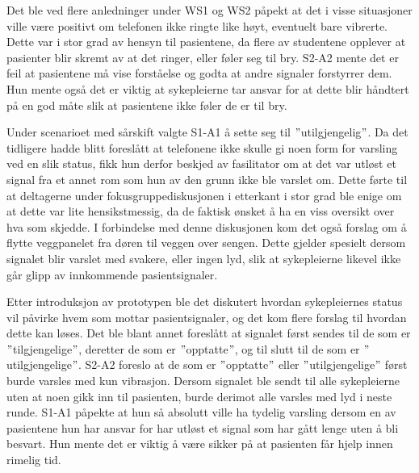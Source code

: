 \noindent
Det ble ved flere anledninger under WS1 og WS2 påpekt at det i visse situasjoner ville være positivt om telefonen ikke ringte like høyt, eventuelt bare vibrerte. Dette var i stor grad av hensyn til pasientene, da flere av studentene opplever at pasienter blir skremt av at det ringer, eller føler seg til bry. S2-A2 mente det er feil at pasientene må vise forståelse og godta at andre signaler forstyrrer dem. Hun mente også det er viktig at sykepleierne tar ansvar for at dette blir håndtert på en god måte slik at pasientene ikke føler de er til bry. 

\noindent
Under scenarioet med sårskift valgte S1-A1 å sette seg til $"$utilgjengelig$"$. Da det tidligere hadde blitt foreslått at telefonene ikke skulle gi noen form for varsling ved en slik status, fikk hun derfor beskjed av fasilitator om at det var utløst et signal fra et annet rom som hun av den grunn ikke ble varslet om. Dette førte til at deltagerne under fokusgruppediskusjonen i etterkant i stor grad ble enige om at dette var lite hensikstmessig, da de faktisk ønsket å ha en viss oversikt over hva som skjedde. I forbindelse med denne diskusjonen kom det også forslag om å flytte veggpanelet fra døren til veggen over sengen. Dette gjelder spesielt dersom signalet blir varslet med svakere, eller ingen lyd, slik at sykepleierne likevel ikke går glipp av innkommende pasientsignaler.

\noindent
Etter introduksjon av prototypen ble det diskutert hvordan sykepleiernes status vil påvirke hvem som mottar pasientsignaler, og det kom flere forslag til hvordan dette kan løses. Det ble blant annet foreslått at signalet først sendes til de som er $"$tilgjengelige$"$, deretter de som er $"$opptatte$"$, og til slutt til de som er $"$utilgjengelige$"$. S2-A2 foreslo at de som er $"$opptatte$"$ eller $"$utilgjengelige$"$ først burde varsles med kun vibrasjon. Dersom signalet ble sendt til alle sykepleierne uten at noen gikk inn til pasienten, burde derimot alle varsles med lyd i neste runde. S1-A1 påpekte at hun så absolutt ville ha tydelig varsling dersom en av pasientene hun har ansvar for har utløst et signal som har gått lenge uten å bli besvart. Hun mente det er viktig å være sikker på at pasienten får hjelp innen rimelig tid. 